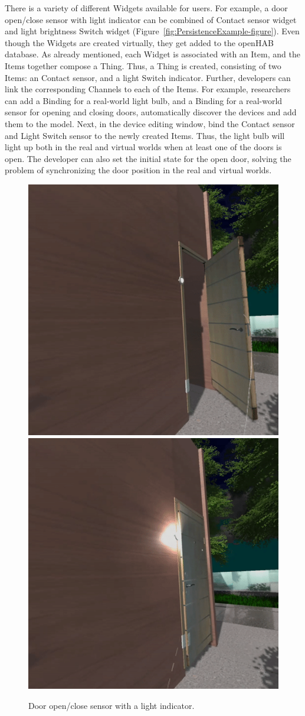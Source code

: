 There is a variety of different Widgets available for users. For example, a door open/close sensor with light indicator can be combined of Contact sensor widget and light brightness Switch widget (Figure~\ref{fig:PersistenceExample-figure}). Even though the Widgets are created virtually, they get added to the openHAB database. As already mentioned, each Widget is associated with an Item, and the Items together compose a Thing. Thus, a Thing is created, consisting of two Items: an Contact sensor, and a light Switch indicator. Further, developers can link the corresponding Channels to each of the Items. For example, researchers can add a Binding for a real-world light bulb, and a Binding for a real-world sensor for opening and closing doors, automatically discover the devices and add them to the model. Next, in the device editing window, bind the Contact sensor and Light Switch sensor to the newly created Items. Thus, the light bulb will light up both in the real and virtual worlds when at least one of the doors is open. The developer can also set the initial state for the open door, solving the problem of synchronizing the door position in the real and virtual worlds. 

\begin{figure}
  \centering
    {\includegraphics[width=0.45\linewidth]{figures/DoorOpen.png}}
    {\includegraphics[width=0.45\linewidth]{figures/DoorClose.png}}
  \caption{Door open/close sensor with a light indicator.}
  \label{fig:doorsensor}
\end{figure}

